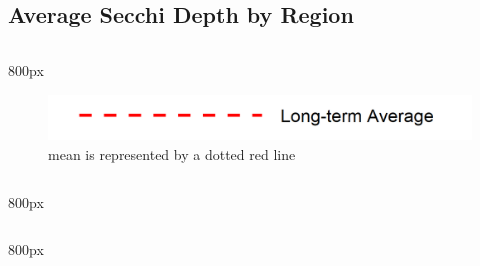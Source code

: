 \documentclass[
]{book}
\begin{document}
\hypertarget{average-secchi-depth-by-region-3}{%
\subsection{Average Secchi Depth by Region}\label{average-secchi-depth-by-region-3}}

\begin{column}{800px\textwidth}
\begin{figure}
\includegraphics[width=15.25in]{figures/mline} \caption{mean is represented by a dotted red line}\label{fig:unnamed-chunk-145}
\end{figure}
\end{column}

\begin{column}{800px\textwidth}
\end{column}

\begin{column}{800px\textwidth}
\end{column}
\end{document}
